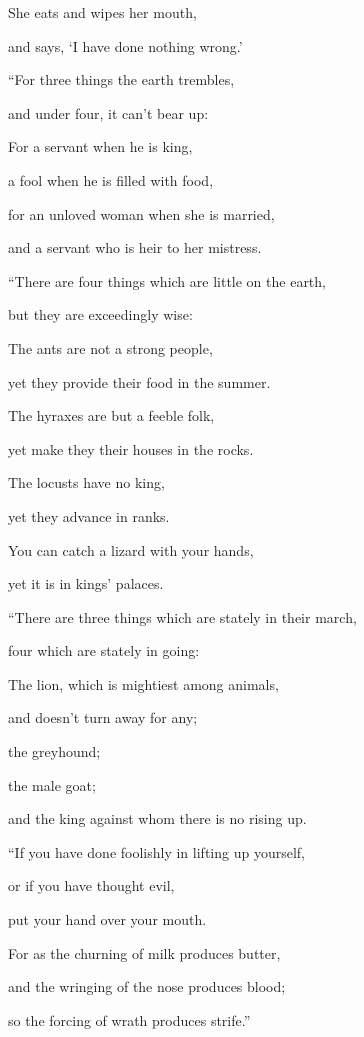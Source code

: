 {\par }{\QB She eats and wipes her mouth,
\par }{\QB and says, ‘I have done nothing wrong.’
\par }{\BB \par }{\Q {}“For three things the earth trembles,
\par }{\QB and under four, it can’t bear up:
\par }{\QB {}For a servant when he is king,
\par }{\QB a fool when he is filled with food,
\par }{\QB {}for an unloved woman when she is married,
\par }{\QB and a servant who is heir to her mistress.
\par }{\BB \par }{\Q {}“There are four things which are little on the earth,
\par }{\QB but they are exceedingly wise:
\par }{\QB {}The ants are not a strong people,
\par }{\QB yet they provide their food in the summer.
\par }{\QB {}The hyraxes are but a feeble folk,
\par }{\QB yet make they their houses in the rocks.
\par }{\QB {}The locusts have no king,
\par }{\QB yet they advance in ranks.
\par }{\QB {}You can catch a lizard with your hands,
\par }{\QB yet it is in kings’ palaces.
\par }{\BB \par }{\Q {}“There are three things which are stately in their march,
\par }{\QB four which are stately in going:
\par }{\QB {}The lion, which is mightiest among animals,
\par }{\QB and doesn’t turn away for any;
\par }{\QB {}the greyhound;
\par }{\QB the male goat;
\par }{\QB and the king against whom there is no rising up.
\par }{\BB \par }{\Q {}“If you have done foolishly in lifting up yourself,
\par }{\QB or if you have thought evil,
\par }{\Q put your hand over your mouth.
\par }{\QB {}For as the churning of milk produces butter,
\par }{\QB and the wringing of the nose produces blood;
\par }{\QB so the forcing of wrath produces strife.”

}
